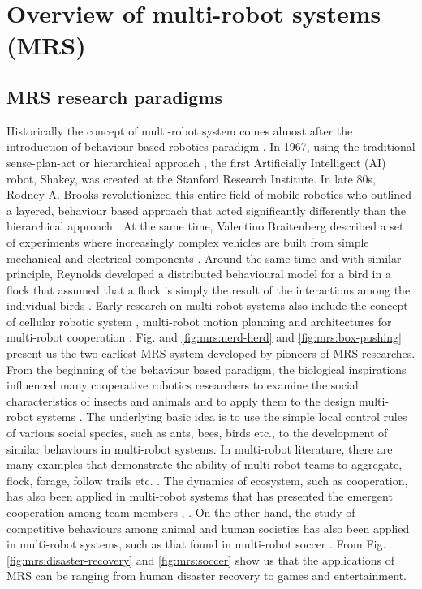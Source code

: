 \section{Overview of multi-robot systems (MRS)}
\label{bg:mrs:overview}
\subsection{MRS research paradigms}
\label{bg:mrs:paradigms}
Historically the concept of multi-robot system comes almost after the introduction of behaviour-based robotics paradigm \cite{Brooks1986,Arkin1990}. In 1967, using the traditional sense-plan-act or hierarchical approach \cite{Murphy2000}, the first Artificially Intelligent (AI) robot, Shakey, was created at the Stanford Research Institute. In late 80s, Rodney A. Brooks revolutionized this entire field of mobile robotics who outlined a layered, behaviour based approach that acted significantly differently than the hierarchical approach \cite{Brooks1986}. At the same time, Valentino Braitenberg described a set of experiments where increasingly complex vehicles are built from simple mechanical and electrical components \cite{Braitenberg1984}. Around the same time and with similar principle, Reynolds developed a distributed behavioural model for a bird in a flock that assumed that a flock is simply the result of the interactions among the individual birds \cite{Reynolds1987}. Early research on multi-robot systems also include the concept of cellular robotic system \cite{Fukuda+1987}, \cite{Beni1988} multi-robot motion planning \cite{Arai+1989,Premvuti+1990,Wang1989} and architectures for multi-robot cooperation \cite{Asama+1989}. Fig. and \ref{fig:mrs:nerd-herd} and \ref{fig:mrs:box-pushing} present us the two earliest MRS system developed by pioneers of MRS researches.\\
%
From the beginning of the behaviour based paradigm, the biological inspirations influenced many cooperative robotics researchers to examine the social characteristics of insects and animals and to apply them to the design multi-robot systems \cite{Arkin1998}. The underlying basic idea is to use the simple local control rules of various social species, such as ants, bees, birds etc., to the development of similar behaviours in multi-robot systems. In multi-robot literature, there are many examples that demonstrate the ability of multi-robot teams to aggregate, flock, forage, follow trails etc. \cite{Bonabeau+1999,Mataric1994}. The dynamics of ecosystem, such as cooperation, has also been applied in multi-robot systems that has presented the emergent cooperation among team members \cite{Mcfarland1994}, \cite{Martinoli+1996}. On the other hand, the study of competitive behaviours among animal and human societies has also been applied in multi-robot systems, such as that found in multi-robot soccer \cite{Asada+1999}. From Fig. \ref{fig:mrs:disaster-recovery} and \ref{fig:mrs:soccer} show us that the applications of MRS can be ranging from human disaster recovery to games and entertainment.\\
